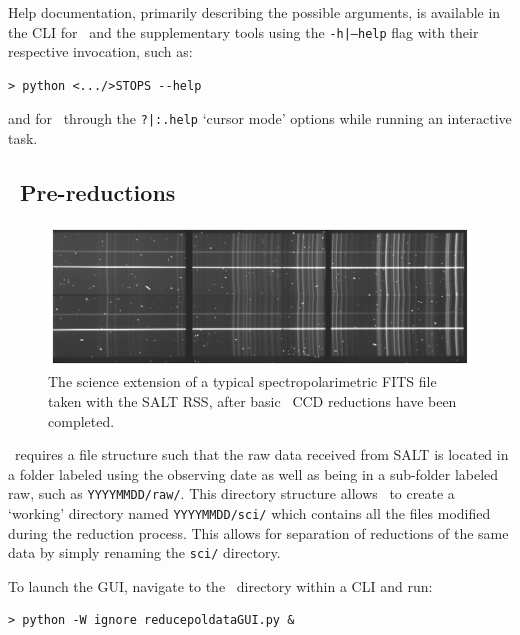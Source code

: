 Help documentation, primarily describing the possible arguments, is available in the \gls{CLI} for \polsalt\ and the supplementary tools using the \texttt{-h|--help} flag with their respective invocation, such as:

\begin{verbatim}> python <.../>STOPS --help\end{verbatim}

\noindent and for \iraf\ through the \texttt{?|:.help} `cursor mode' options while running an interactive task.


\subsection{\polsalt\ Pre-reductions}\label{subsec:reduc_pre}

\begin{figure}[t]
    \centering
    \includegraphics[width = 1.0\textwidth]{figures/3_pre_wav_cal.pdf}
    \caption{The science extension of a typical spectropolarimetric \acs{FITS} file taken with the \gls{SALT} \gls{RSS}, after basic \polsalt\ \gls{CCD} reductions have been completed.}
    \label{fig:polsalt_pre_wav_cal}
\end{figure}


\polsalt\ requires a file structure such that the raw data received from \gls{SALT} is located in a folder labeled using the observing date as well as being in a sub-folder labeled raw, such as \texttt{YYYYMMDD/raw/}. This directory structure allows \polsalt\ to create a `working' directory named \texttt{YYYYMMDD/sci/} which contains all the files modified during the reduction process. This allows for separation of reductions of the same data by simply renaming the \texttt{sci/} directory.

To launch the \gls{GUI}, navigate to the \polsalt\ directory within a \gls{CLI} and run:

\begin{verbatim}> python -W ignore reducepoldataGUI.py &\end{verbatim}


